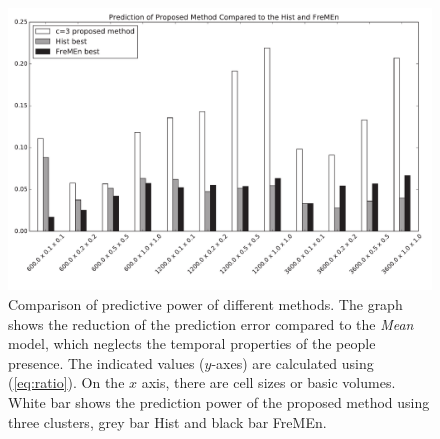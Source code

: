 \begin{figure}[!t]
\begin{center}
    \includegraphics[width=1.0\columnwidth]{fig/ours3_hist_fremen.pdf}
    \caption{Comparison of predictive power of different methods. 
The graph shows the reduction of the prediction error compared to the \textit{Mean} model, which neglects the temporal properties of the people presence.
The indicated values ($y$-axes) are calculated using (\ref{eq:ratio}). 
On the $x$ axis, there are cell sizes or basic volumes.
White bar shows the prediction power of the proposed method using three clusters, grey bar Hist and black bar FreMEn.\label{graph:pedestrians}}
\end{center}
\end{figure}

